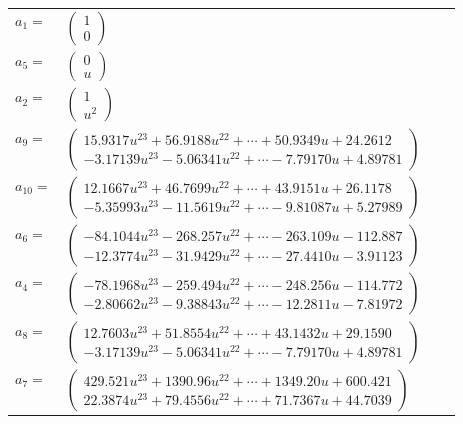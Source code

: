 \documentclass[1p]{elsarticle_modified}
\theoremstyle{definition}
\begin{document}
\begin{tabular}{m{7pt} m{180pt} m{7pt} m{180pt} }
\flushright $a_{1}=$&$\begin{pmatrix}1\\0\end{pmatrix}$ \\
\flushright $a_{5}=$&$\begin{pmatrix}0\\u\end{pmatrix}$ \\
\flushright $a_{2}=$&$\begin{pmatrix}1\\u^2\end{pmatrix}$ \\
\flushright $a_{9}=$&$\begin{pmatrix}15.9317 u^{23}+56.9188 u^{22}+\cdots+50.9349 u+24.2612\\-3.17139 u^{23}-5.06341 u^{22}+\cdots-7.79170 u+4.89781\end{pmatrix}$ \\
\flushright $a_{10}=$&$\begin{pmatrix}12.1667 u^{23}+46.7699 u^{22}+\cdots+43.9151 u+26.1178\\-5.35993 u^{23}-11.5619 u^{22}+\cdots-9.81087 u+5.27989\end{pmatrix}$ \\
\flushright $a_{6}=$&$\begin{pmatrix}-84.1044 u^{23}-268.257 u^{22}+\cdots-263.109 u-112.887\\-12.3774 u^{23}-31.9429 u^{22}+\cdots-27.4410 u-3.91123\end{pmatrix}$ \\
\flushright $a_{4}=$&$\begin{pmatrix}-78.1968 u^{23}-259.494 u^{22}+\cdots-248.256 u-114.772\\-2.80662 u^{23}-9.38843 u^{22}+\cdots-12.2811 u-7.81972\end{pmatrix}$ \\
\flushright $a_{8}=$&$\begin{pmatrix}12.7603 u^{23}+51.8554 u^{22}+\cdots+43.1432 u+29.1590\\-3.17139 u^{23}-5.06341 u^{22}+\cdots-7.79170 u+4.89781\end{pmatrix}$ \\
\flushright $a_{7}=$&$\begin{pmatrix}429.521 u^{23}+1390.96 u^{22}+\cdots+1349.20 u+600.421\\22.3874 u^{23}+79.4556 u^{22}+\cdots+71.7367 u+44.7039\end{pmatrix}$ \\

\end{tabular}
\end{document}
